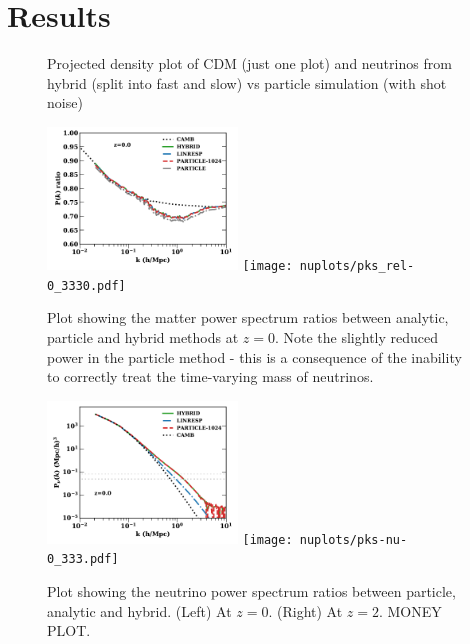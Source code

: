 \documentclass[useAMS, usenatbib]{mnras}
\begin{document}

%


\section{Results}
\label{sec:results}

\begin{figure}
  \caption{Projected density plot of CDM (just one plot) and neutrinos from hybrid (split into fast and slow) vs particle simulation (with shot noise)}
  \label{fig:density_plot}
\end{figure}

\begin{figure}
\includegraphics[width=0.45\textwidth]{nuplots/pks_rel-10.pdf}
\texttt{[image: nuplots/pks\_rel-0\_3330.pdf]}
  \caption{Plot showing the matter power spectrum ratios between analytic, particle and hybrid methods at $z=0$. Note the slightly reduced power in the particle method - this is a consequence of the inability to correctly treat the time-varying mass of neutrinos.
  }
  \label{fig:matter_power}
\end{figure}

\begin{figure}
\includegraphics[width=0.45\textwidth]{nuplots/pks-nu-1.pdf}
\texttt{[image: nuplots/pks-nu-0\_333.pdf]}
  \caption{Plot showing the neutrino power spectrum ratios between particle, analytic and hybrid.
  (Left) At $z=0$. (Right) At $z=2$.
  MONEY PLOT.}
  \label{fig:neutrino_power}
\end{figure}
\end{document}

